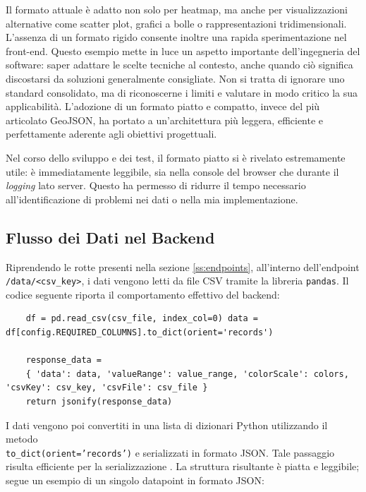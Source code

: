 Il formato attuale è adatto non solo per heatmap, ma anche per visualizzazioni
alternative come scatter plot, grafici a bolle o rappresentazioni tridimensionali.
L'assenza di un formato rigido consente inoltre una rapida sperimentazione nel
front-end. Questo esempio mette in luce un aspetto importante dell'ingegneria del
software: saper adattare le scelte tecniche al contesto, anche quando ciò significa
discostarsi da soluzioni generalmente consigliate. Non si tratta di ignorare uno
standard consolidato, ma di riconoscerne i limiti e valutare in modo critico la sua
applicabilità. L'adozione di un formato piatto e compatto, invece del più articolato
GeoJSON, ha portato a un'architettura più leggera, efficiente e perfettamente aderente
agli obiettivi progettuali.

Nel corso dello sviluppo e dei test, il formato piatto si è rivelato
estremamente utile: è immediatamente leggibile, sia nella console del browser
che durante il \textit{logging} lato server. Questo ha permesso di ridurre il
tempo necessario all'identificazione di problemi nei dati o nella mia
implementazione.

\subsection{Flusso dei Dati nel Backend}

Riprendendo le rotte presenti nella sezione \ref{ss:endpoints}, all'interno dell'endpoint
\texttt{/data/<csv\_key>}, i dati vengono letti da file CSV tramite la libreria
\texttt{pandas}. Il codice seguente riporta il comportamento effettivo del
backend:

\begin{listing}
  [H]
  \caption{Lettura e serializzazione dei dati CSV}
  \label{lst:csv_reading_serialization} %
  \begin{verbatim}
    df = pd.read_csv(csv_file, index_col=0) data = df[config.REQUIRED_COLUMNS].to_dict(orient='records')

    response_data =
    { 'data': data, 'valueRange': value_range, 'colorScale': colors, 'csvKey': csv_key, 'csvFile': csv_file }
    return jsonify(response_data)
  \end{verbatim}
\end{listing}

I dati vengono poi convertiti in una lista di dizionari Python utilizzando il metodo\\
\texttt{to\_dict(orient='records')} e serializzati in formato JSON. Tale
passaggio risulta efficiente per la serializzazione \cite{pandas-todict}. La struttura
risultante è piatta e leggibile; segue un esempio di un singolo datapoint in
formato JSON:

